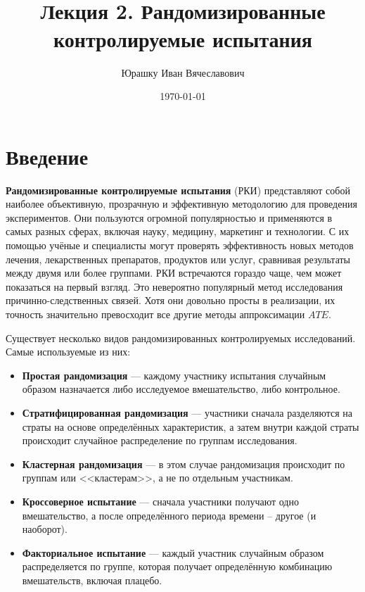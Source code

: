 \documentclass{article}
\title{
    \textbf{\coursename}\\
    Лекция 2. Рандомизированные контролируемые испытания
}
\author{Юрашку Иван Вячеславович}
\date{\today}
\begin{document}
    \maketitle

    \section{Введение}

    \textbf{Рандомизированные контролируемые испытания} (РКИ) представляют собой наиболее объективную, прозрачную и эффективную методологию для проведения экспериментов.
    Они пользуются огромной популярностью и применяются в самых разных сферах, включая науку, медицину, маркетинг и технологии.
    С их помощью учёные и специалисты могут проверять эффективность новых методов лечения, лекарственных препаратов, продуктов или услуг, сравнивая результаты между двумя или более группами.
    РКИ встречаются гораздо чаще, чем может показаться на первый взгляд.
    Это невероятно популярный метод исследования причинно-следственных связей.
    Хотя они довольно просты в реализации, их точность значительно превосходит все другие методы аппроксимации $ATE$.


    Существует несколько видов рандомизированных контролируемых исследований. Самые используемые из них:

    \begin{itemize}
        \item \textbf{Простая рандомизация} --- каждому участнику испытания случайным образом назначается либо исследуемое вмешательство, либо контрольное.
        \item \textbf{Стратифицированная рандомизация} --- участники сначала разделяются на страты на основе определённых характеристик, а затем внутри каждой страты происходит случайное распределение по группам исследования.
        \item \textbf{Кластерная рандомизация} --- в этом случае рандомизация происходит по группам или <<кластерам>>, а не по отдельным участникам.
        \item \textbf{Кроссоверное испытание} --- сначала участники получают одно вмешательство, а после определённого периода времени -- другое (и наоборот).
        \item \textbf{Факториальное испытание} --- каждый участник случайным образом распределяется по группе, которая получает определённую комбинацию вмешательств, включая плацебо.
    \end{itemize}
\end{document}

